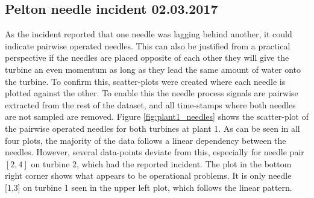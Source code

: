     \subsection{Pelton needle incident 02.03.2017}
        As the incident reported that one needle was lagging behind another, it could indicate pairwise operated needles. This can also be justified from a practical perspective if the needles are placed opposite of each other they will give the turbine an even momentum as long as they lead the same amount of water onto the turbine. To confirm this, scatter-plots were created where each needle is plotted against the other. To enable this the needle process signals are pairwise extracted from the rest of the dataset, and all time-stamps where both needles are not sampled are removed. Figure \ref{fig:plant1_needles} shows the scatter-plot of the pairwise operated needles for both turbines at plant 1. As can be seen in all four plots, the majority of the data follows a linear dependency between the needles. However, several data-points deviate from this, especially for needle pair $[2,4]$ on turbine $2$, which had the reported incident. The plot in the bottom right corner shows what appears to be operational problems. It is only needle [1,3] on turbine 1 seen in the upper left plot, which follows the linear pattern.
